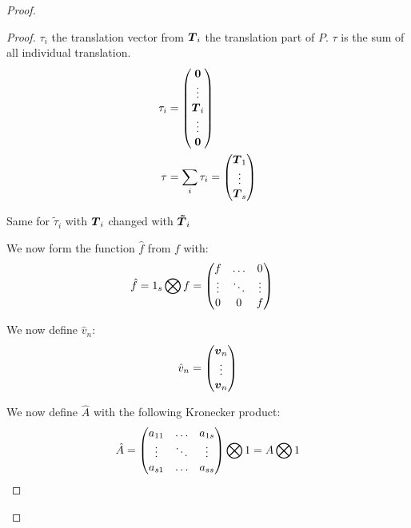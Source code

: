 \begin{proof}
\begin{proof}
$\tau_{i}$ the translation vector from ${\boldsymbol {T}}_i$ the translation part of $P$.
$\tau$ is the sum of all individual translation.
\begin{align}
	\tau_i&=\begin{pmatrix}
			{\boldsymbol {0}}\\
			\vdots\\
			{\boldsymbol {T}}_{i}\\
			\vdots\\
			{\boldsymbol {0}}\\
	\end{pmatrix}
	\\
	\tau&=\sum_{i}\tau_{i}=\begin{pmatrix}
			{\boldsymbol {T}}_{1}\\
			\vdots\\
			{\boldsymbol {T}}_{s}\\
	\end{pmatrix}
\end{align}

Same for $\tilde{\tau}_{i}$ with ${\boldsymbol {T}}_{i}$ changed with ${\boldsymbol {\tilde{T}}}_i$

We now form the function $\hat{f}$ from $f$ with:
\begin{align}
\hat{f}&=1_{s}\bigotimes f=\begin{pmatrix}f	&\ldots	&0\\
			\vdots &\ddots 	&\vdots\\
			0	&0	&f\\
	\end{pmatrix}
\end{align}

We now define $\hat{v}_n$:
\begin{equation}
\hat{v}_{n}=\begin{pmatrix}
	      {\boldsymbol {v}}_{n}\\
	      \vdots\\
	      {\boldsymbol {v}}_{n}
	      \end{pmatrix}
\end{equation}

We now define $\hat{A}$ with the following Kronecker product:
\begin{equation}
\hat{A}=\begin{pmatrix}
    a_{11}	&\ldots	&a_{1s}\\
    \vdots	&\ddots	&\vdots\\
    a_{s1}	&\ldots	&a_{ss}\\
  \end{pmatrix} \bigotimes 1=A \bigotimes 1
\end{equation}


\end{proof}
\end{proof}
